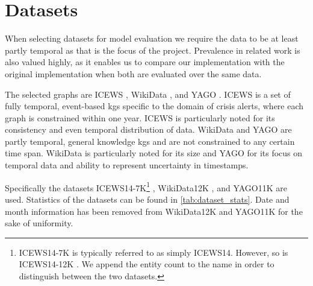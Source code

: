 \section{Datasets}
\label{sec:datasets}
When selecting datasets for model evaluation we require the data to be at least partly temporal as that is the focus of the project. Prevalence in related work is also valued highly, as it enables us to compare our implementation with the original implementation when both are evaluated over the same data.

The selected graphs are ICEWS \cite{boschee2015ICEWS}, WikiData \cite{vrandecic2014wikidata}, and YAGO \cite{mahdisoltani2015YAGO3, tahon2020YAGO4}. 
ICEWS is a set of fully temporal, event-based \glspl{kg} specific to the domain of crisis alerts, where each graph is constrained within one year.
ICEWS is particularly noted for its consistency and even temporal distribution of data. 
WikiData and YAGO are partly temporal, general knowledge \glspl{kg} and are not constrained to any certain time span.
WikiData is particularly noted for its size and YAGO for its focus on temporal data and ability to represent uncertainty in timestamps.



Specifically the datasets ICEWS14-7K\footnote{ICEWS14-7K is typically referred to as simply ICEWS14. However, so is ICEWS14-12K \cite{trivedi2017knowevolve}. We append the entity count to the name in order to distinguish between the two datasets.} \cite{garcia-duran2018ta}, WikiData12K \cite{dasgupta2018hyte}, and YAGO11K \cite{dasgupta2018hyte} are used. Statistics of the datasets can be found in \autoref{tab:dataset_stats}. Date and month information has been removed from WikiData12K and YAGO11K for the sake of uniformity.